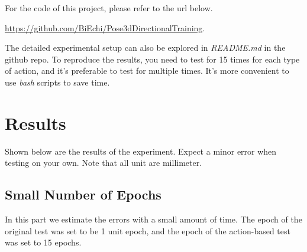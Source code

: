 \documentclass[10pt,twocolumn,letterpaper]{article}
\begin{document}
For the code of this project, please refer to the url below.

\url{https://github.com/BiEchi/Pose3dDirectionalTraining}. 
 
The detailed experimental setup can also be explored in \textit{README.md} in the github repo. To reproduce
the results, you need to test for 15 times for each type of action, and it's preferable to test for multiple
times. It's more convenient to use \textit{bash} scripts to save time.


\section{Results}

Shown below are the results of the experiment. Expect a minor error when testing on your own. Note that all
unit are millimeter.

\subsection{Small Number of Epochs}

In this part we estimate the errors with a small amount of time. The epoch of the original test was set to 
be 1 unit epoch, and the epoch of the action-based test was set to 15 epochs.
\end{document}
